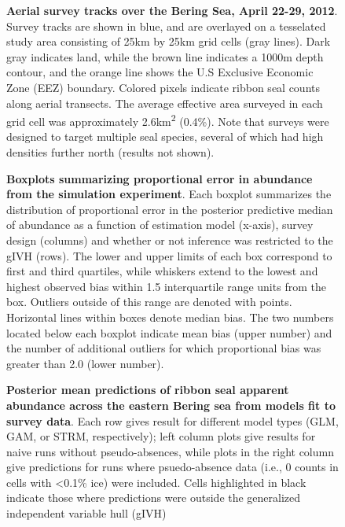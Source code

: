 \documentclass[10pt,letterpaper]{article}
\begin{document}
\begin{figure}[!h]
\caption{{\bf Aerial survey tracks over the Bering Sea, April 22-29, 2012}. Survey tracks are shown in blue, and are overlayed on a tesselated study area consisting of 25km by 25km grid cells (gray lines).  Dark gray indicates land, while the brown line indicates a 1000m depth contour, and the orange line shows the U.S Exclusive Economic Zone (EEZ) boundary. Colored pixels indicate ribbon seal counts along aerial transects. The average effective area surveyed in each grid cell was approximately 2.6km\textsuperscript{2} (0.4\%).  Note that surveys were designed to target multiple seal species, several of which had high densities further north (results not shown). }
\label{fig:flights}
\end{figure}

\begin{figure}[!h]
\caption{{\bf Boxplots summarizing proportional error in abundance from the simulation experiment}. Each boxplot summarizes the distribution of proportional error in the posterior predictive median of abundance as a function of estimation model (x-axis), survey design (columns) and whether or not inference was restricted to the gIVH (rows).  The lower and upper limits of each box correspond to first and third quartiles, while whiskers extend to the lowest and highest observed bias within 1.5 interquartile range units from the box.  Outliers outside of this range are denoted with points.  Horizontal lines within boxes denote median bias.  The two numbers located below each boxplot indicate mean bias (upper number) and the number of additional outliers for which proportional bias was greater than 2.0 (lower number). }
\label{fig:sim_boxplots}
\end{figure}


\begin{figure}[!h]
\caption{{\bf Posterior mean predictions of ribbon seal apparent abundance across the eastern Bering sea from models fit to survey data}.  Each row gives result for different model types (GLM, GAM, or STRM, respectively); left column plots give results for naive runs without pseudo-absences, while plots in the right column give predictions for runs where psuedo-absence data (i.e., 0 counts in cells with \textless 0.1\% ice) were included. Cells highlighted in black indicate those where predictions were outside the generalized independent variable hull (gIVH) }
\label{fig:ribbon_plot}
\end{figure}
\end{document}
